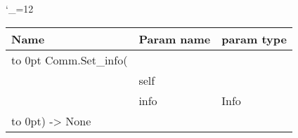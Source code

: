 \begingroup \catcode`\_=12 \tt
\begin{tabular}{lll}
\toprule
\textrm{Name}&\textrm{Param name}&\textrm{param type}\\
\midrule
\hbox to 0pt {Comm.Set_info(\hss}\\
& self\\
& info & Info\\
\hbox to 0pt{) -> None\hss}\\
\bottomrule
\end{tabular}
\endgroup
